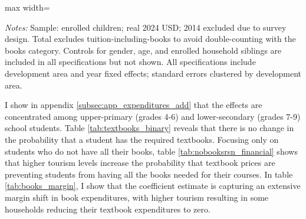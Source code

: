 \documentclass[12pt]{article}
\newcommand*{\TableLagOnePath}{../Paper_3_Tables/Lagged_1Year_Tables}
\begin{document}
	\begin{table}[h]
	\centering
	\begin{adjustbox}{max width=\textwidth}
	\begin{threeparttable}
		\caption{School Expenditure by Category, IV Estimates}
		\label{tab:expenditures_level}
		{\small}
		\begin{tablenotes}
			\small
			\item \textit{Notes:} Sample: enrolled children; real 2024 USD; 2014 excluded due to survey design. Total excludes tuition-including-books to avoid double-counting with the books category. Controls for gender, age, and enrolled household siblings are included in all specifications but not shown. All specifications include development area and year fixed effects; standard errors clustered by development area.
		\end{tablenotes}
	\end{threeparttable}
	\end{adjustbox}
	\end{table}


  I show in appendix \ref{subsec:app_expenditures_add} that the effects are concentrated among upper-primary (grades 4-6) and lower-secondary (grades 7-9) school students. 
  Table \ref{tab:textbooks_binary} reveals that there is no change in the probability that a student has the required textbooks. Focusing only on students who do not have all their books, table \ref{tab:nobooksrsn_financial} shows that higher tourism levels increase the probability that textbook prices are preventing students from having all the books needed for their courses. In table \ref{tab:books_margin}, I show that the coefficient estimate is capturing an extensive margin shift in book expenditures, with higher tourism resulting in some households reducing their textbook expenditures to zero. 
  
\end{document}
